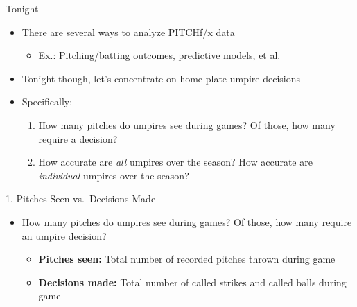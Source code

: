\begin{frame}{Tonight}

\begin{itemize}

\item
  There are several ways to analyze PITCHf/x data

  \begin{itemize}
  
  \item
    Ex.: Pitching/batting outcomes, predictive models, et al.
  \end{itemize}
\item
  Tonight though, let's concentrate on home plate umpire decisions
\item
  Specifically:

  \begin{enumerate}
  \def\labelenumi{\arabic{enumi}.}
  
  \item
    How many pitches do umpires see during games? Of those, how many
    require a decision?
  \item
    How accurate are \emph{all} umpires over the season? How accurate
    are \emph{individual} umpires over the season?
  \end{enumerate}
\end{itemize}

\end{frame}

\begin{frame}{1. Pitches Seen vs.~Decisions Made}

\begin{itemize}

\item
  How many pitches do umpires see during games? Of those, how many
  require an umpire decision?

  \begin{itemize}
  
  \item
    \textbf{Pitches seen:} Total number of recorded pitches thrown
    during game
  \item
    \textbf{Decisions made:} Total number of called strikes and called
    balls during game
  \end{itemize}
\end{itemize}

\end{frame}

